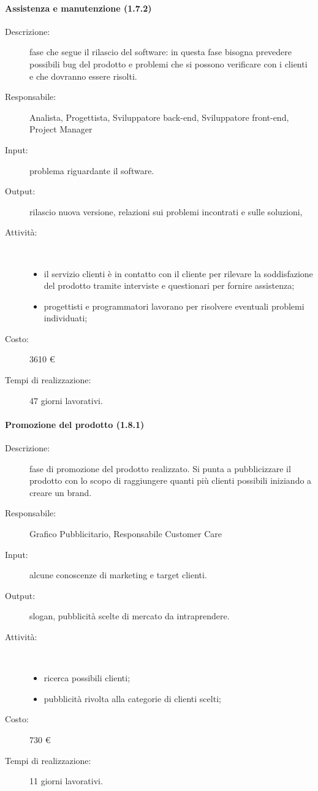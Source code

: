 \paragraph{Assistenza e manutenzione (1.7.2)}
\begin{description}
\item[Descrizione:] fase che segue il rilascio del software: in questa fase bisogna prevedere
possibili bug del prodotto e problemi che si possono verificare con i clienti e che dovranno essere risolti.
\item[Responsabile:] Analista, Progettista, Sviluppatore back-end, Sviluppatore front-end, Project Manager
\item[Input:] problema riguardante il software.
\item[Output:] rilascio nuova versione, relazioni sui problemi incontrati e sulle soluzioni,
\item[Attività:]\mbox{}\\[-1.5\baselineskip]
	\begin{itemize}
	\item il servizio clienti \`{e} in contatto con il cliente per rilevare la
	soddisfazione del prodotto tramite interviste e questionari per fornire assistenza;
	\item progettisti e programmatori lavorano per risolvere eventuali problemi individuati;
	\end{itemize}
\item[Costo:] 3610 \euro{}
\item[Tempi di realizzazione:] 47 giorni lavorativi.
\end{description}

\paragraph{Promozione del prodotto (1.8.1)}
\begin{description}
\item[Descrizione:] fase di promozione del prodotto realizzato. Si punta a pubblicizzare il prodotto con lo scopo di raggiungere quanti pi\`{u} clienti possibili iniziando a creare un brand.
\item[Responsabile:] Grafico Pubblicitario, Responsabile Customer Care
\item[Input:] alcune conoscenze di marketing e target clienti.
\item[Output:] slogan, pubblicità scelte di mercato da intraprendere.
\item[Attività:]\mbox{}\\[-1.5\baselineskip]
	\begin{itemize}
	\item ricerca possibili clienti;
	\item pubblicità rivolta alla categorie di clienti scelti;
	\end{itemize}
\item[Costo:] 730 \euro{}
\item[Tempi di realizzazione:] 11 giorni lavorativi.
\end{description}

